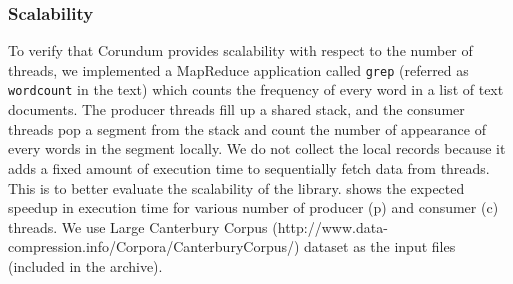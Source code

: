 {%


\subsubsection{Scalability}
To verify that Corundum provides scalability with respect to the number of threads, we implemented a MapReduce application called \verb+grep+ (referred as \verb+wordcount+ in the text) which counts the frequency of every word in a list of text documents. The producer threads fill up a shared stack, and the consumer threads pop a segment from the stack and count the number of appearance of every words in the segment locally. We do not collect the local records because it adds a fixed amount of execution time to sequentially fetch data from threads. This is to better evaluate the scalability of the library.  shows the expected speedup in execution time for various number of producer (p) and consumer (c) threads. We use Large Canterbury Corpus (http://www.data-compression.info/Corpora/CanterburyCorpus/) dataset as the input files (included in the archive).



}
